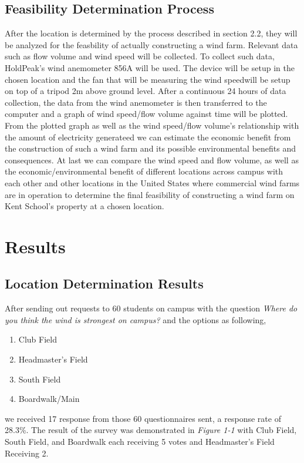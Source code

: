 \documentclass[review]{elsarticle}
\begin{document}
\subsection{Feasibility Determination Process}
After the location is determined by the process described in section 2.2, they will be analyzed for the feasbility of actually constructing a wind farm. Relevant data 
such as flow volume and wind speed will be collected. To collect such data, HoldPeak's wind anemometer 856A will be used. The device will be setup in the chosen location 
and the fan that will be measuring the wind speedwill be setup on top of a tripod 2m above ground level. After a continuous 24 hours of data collection, the data from the 
wind anemometer is then transferred to the computer and a graph of wind speed/flow volume against time will be plotted.
\\\indent From the plotted graph as well as the wind speed/flow volume's relationship with the amount of electricity generateed we can estimate the economic benefit from 
the construction of such a wind farm and its possible environmental benefits and consequences. At last we can compare the wind speed and flow volume, as well as the 
economic/environmental benefit of different locations across campus with each other and other locations in the United States where commercial wind farms are in operation 
to determine the final feasibility of constructing a wind farm on Kent School's property at a chosen location.

\section{Results}
\subsection{Location Determination Results}
After sending out requests to 60 students on campus with the question \textit{Where do you think the wind is strongest on campus?} and the options as following,
\begin{enumerate}
    \item {Club Field}
    \item {Headmaster's Field}
    \item {South Field}
    \item {Boardwalk/Main}   
\end{enumerate}
we received 17 response from those 60 questionnaires sent, a response rate of 28.3\%. The result of the survey was demonstrated in \textit{Figure 1-1} with Club Field, South Field, and Boardwalk each receiving 5 votes and Headmaster's Field Receiving 2. 
\end{document}
